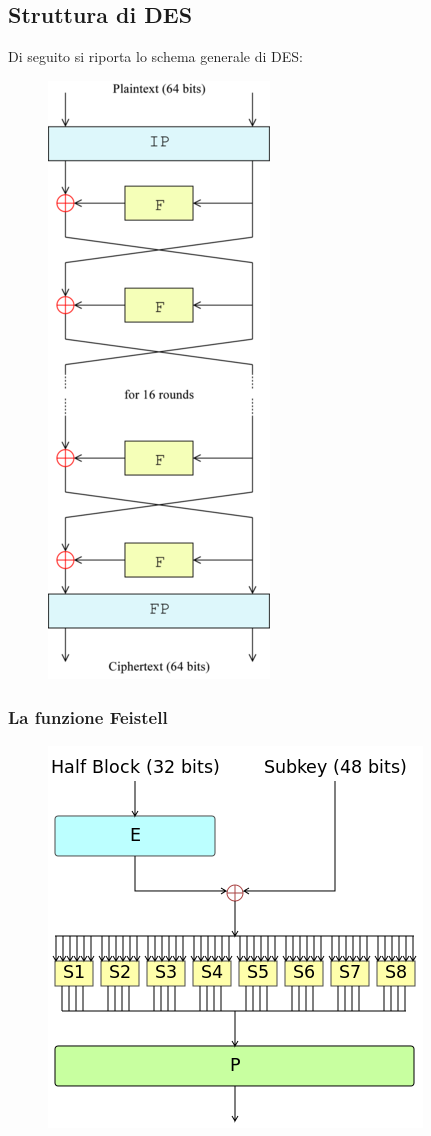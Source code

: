 \documentclass[10pt,a4paper]{article}
\begin{document}
\subsection{Struttura di DES}
Di seguito si riporta lo schema generale di DES:

\begin{figure}[htbp]
\includegraphics[scale=0.6]{immagini/DES_fastell.png}
\end{figure}

\subsubsection{La funzione Feistell}

\begin{figure}[htbp]
\includegraphics[scale=0.6]{immagini/DES_round.png}
\end{figure}
\end{document}

